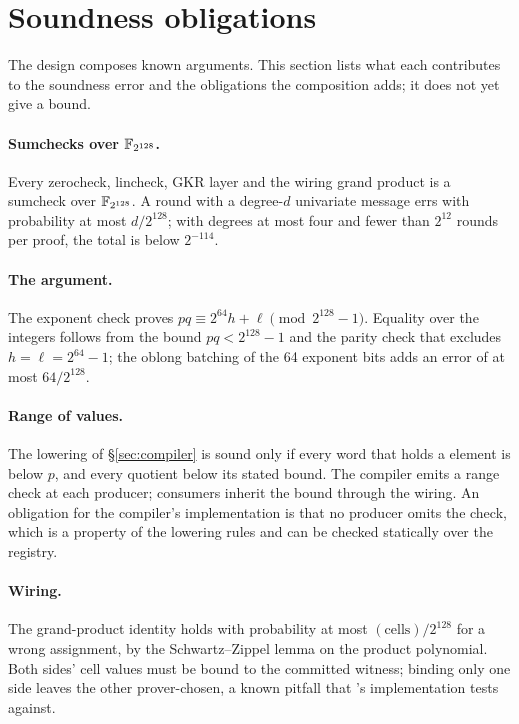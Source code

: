 \section{Soundness obligations}\label{sec:soundness}

The design composes known arguments. This section lists what each contributes to the soundness error and the obligations the composition adds; it does not yet give a bound.

\paragraph{Sumchecks over $\mathbb{F}_{2^{128}}$.} Every zerocheck, lincheck, GKR layer and the wiring grand product is a sumcheck over $\mathbb{F}_{2^{128}}$. A round with a degree-$d$ univariate message errs with probability at most $d/2^{128}$; with degrees at most four and fewer than $2^{12}$ rounds per proof, the total is below $2^{-114}$.

\paragraph{The \MUL{} argument.} The exponent check proves $pq \equiv 2^{64}h + \ell \pmod{2^{128}-1}$. Equality over the integers follows from the bound $pq < 2^{128}-1$ and the parity check that excludes $h = \ell = 2^{64}-1$; the oblong batching of the 64 exponent bits adds an error of at most $64/2^{128}$.

\paragraph{Range of \KB{} values.} The lowering of \S\ref{sec:compiler} is sound only if every word that holds a \KB{} element is below $p$, and every quotient below its stated bound. The compiler emits a range check at each producer; consumers inherit the bound through the wiring. An obligation for the compiler's implementation is that no producer omits the check, which is a property of the lowering rules and can be checked statically over the registry.

\paragraph{Wiring.} The grand-product identity holds with probability at most $(\text{cells})/2^{128}$ for a wrong assignment, by the Schwartz--Zippel lemma on the product polynomial. Both sides' cell values must be bound to the committed witness; binding only one side leaves the other prover-chosen, a known pitfall that \Flock{}'s implementation tests against.

